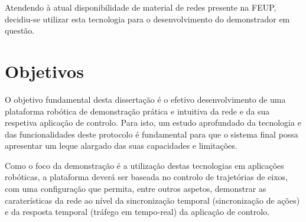 Atendendo à atual disponibilidade de material de redes \ecat presente na
FEUP, decidiu-se utilizar esta tecnologia para o desenvolvimento do
demonstrador em questão.


\section{Objetivos}\label{sec:objetivos}

O objetivo fundamental desta dissertação é o efetivo desenvolvimento de
uma plataforma robótica de demonstração prática e intuitiva da rede \ecat
e da sua respetiva aplicação de controlo. Para isto, um estudo aprofundado
da tecnologia e das funcionalidades deste protocolo é fundamental para
que o sistema final possa apresentar um leque alargado das suas
capacidades e limitações.

Como o foco da demonstração é a utilização destas tecnologias em
aplicações robóticas, a plataforma deverá ser baseada no controlo de
trajetórias de eixos, com uma configuração que permita, entre outros
aspetos, demonstrar as caraterísticas da rede \ecat ao nível da
sincronização temporal (sincronização de ações) e da resposta temporal
(tráfego em tempo-real) da aplicação de controlo.
